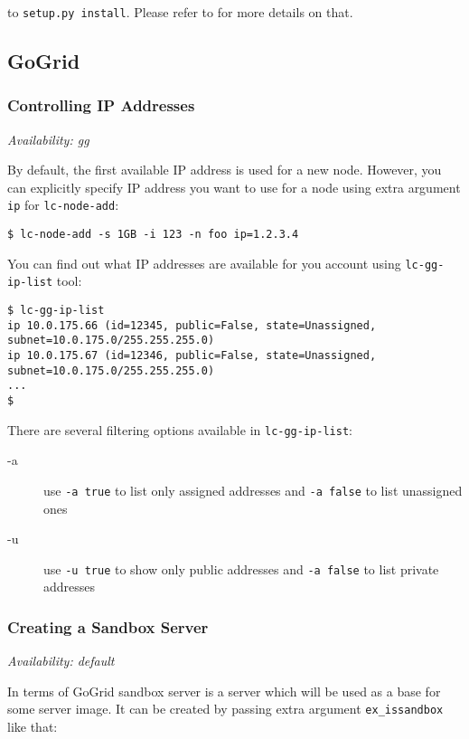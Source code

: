\documentclass[a4paper]{report}
\begin{document}
to \texttt{setup.py install}. Please refer to  for more details on that.

\subsection{GoGrid}
\subsubsection{Controlling IP Addresses}

\textit{Availability: gg}

By default, the first available IP address is used for a new node. However, you
can explicitly specify IP address you want to use for a node using extra
argument {\tt ip} for \texttt{lc-node-add}:

\begin{verbatim}
$ lc-node-add -s 1GB -i 123 -n foo ip=1.2.3.4
\end{verbatim}

You can find out what IP addresses are available for you account using 
\texttt{lc-gg-ip-list} tool:

\begin{verbatim}
$ lc-gg-ip-list
ip 10.0.175.66 (id=12345, public=False, state=Unassigned, subnet=10.0.175.0/255.255.255.0)
ip 10.0.175.67 (id=12346, public=False, state=Unassigned, subnet=10.0.175.0/255.255.255.0)
...
$
\end{verbatim}

There are several filtering options available in \texttt{lc-gg-ip-list}:

\begin{description}
  \item[-a] use \texttt{-a true} to list only assigned addresses and
       \texttt{-a false} to list unassigned ones
  \item[-u] use \texttt{-u true} to show only public addresses and
       \texttt{-a false} to list private addresses
\end{description}

\subsubsection{Creating a Sandbox Server}

\textit{Availability: default}

In terms of GoGrid sandbox server is a server which will be used as a base for
some server image. It can be created by passing extra argument {\tt ex\_issandbox}
like that:
\end{document}
